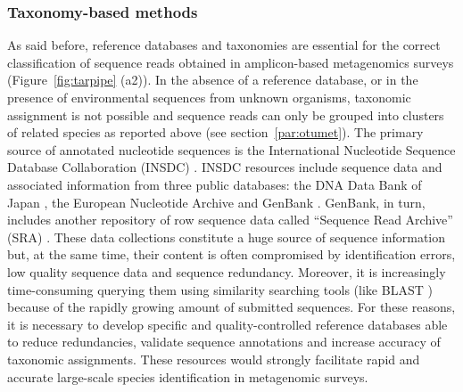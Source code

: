 \subsubsection*{Taxonomy-based methods}
As said before, reference databases and taxonomies are essential for the correct classification of sequence reads obtained in amplicon-based metagenomics surveys (Figure~\ref{fig:tarpipe} (a2)). In the absence of a reference database, or in the presence of environmental sequences from unknown organisms, taxonomic assignment is not possible and sequence reads can only be grouped into clusters of related species as reported above (see section~\ref{par:otumet}). The primary source of annotated nucleotide sequences is the International Nucleotide Sequence Database Collaboration (INSDC) \cite{nakamura2013international}. INSDC resources include sequence data and associated information from three public databases: the DNA Data Bank of Japan \cite{sugawara2007ddbj}, the European Nucleotide Archive \cite{leinonen2010european} and GenBank \cite{benson2012genbank}. GenBank, in turn, includes another repository of row sequence data called ``Sequence Read Archive'' (SRA) \cite{kodama2012sequence}. These data collections constitute a huge source of sequence information but, at the same time, their content is often compromised by identification errors, low quality sequence data and sequence redundancy. Moreover, it is increasingly time-consuming querying them using similarity searching tools (like BLAST \cite{altschul1990basic}) because of the rapidly growing amount of submitted sequences. For these reasons, it is necessary to develop specific and quality-controlled reference databases able to reduce redundancies, validate sequence annotations and increase accuracy of taxonomic assignments. These resources would strongly facilitate rapid and accurate large-scale species identification in metagenomic surveys.\\

